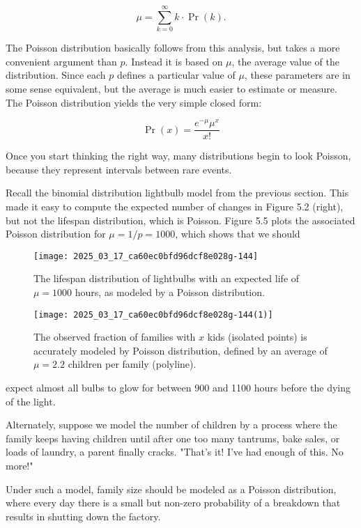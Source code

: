 \documentclass[10pt]{article}
\begin{document}
\[
\mu=\sum_{k=0}^{\infty} k \cdot \operatorname{Pr}(k).
\]

The Poisson distribution basically follows from this analysis, but takes a more convenient argument than $p$. Instead it is based on $\mu$, the average value of the distribution. Since each $p$ defines a particular value of $\mu$, these parameters are in some sense equivalent, but the average is much easier to estimate or measure. The Poisson distribution yields the very simple closed form:

\[
\operatorname{Pr}(x)=\frac{e^{-\mu} \mu^{x}}{x!}
\]

Once you start thinking the right way, many distributions begin to look Poisson, because they represent intervals between rare events.

Recall the binomial distribution lightbulb model from the previous section. This made it easy to compute the expected number of changes in Figure 5.2 (right), but not the lifespan distribution, which is Poisson. Figure 5.5 plots the associated Poisson distribution for $\mu=1 / p=1000$, which shows that we should\\
\begin{figure}[h]
\centering
\texttt{[image: 2025\_03\_17\_ca60ec0bfd96dcf8e028g-144]}
\caption{The lifespan distribution of lightbulbs with an expected life of $\mu= 1000$ hours, as modeled by a Poisson distribution.}
\end{figure}

\begin{figure}[h]
\centering
\texttt{[image: 2025\_03\_17\_ca60ec0bfd96dcf8e028g-144(1)]}
\caption{The observed fraction of families with $x$ kids (isolated points) is accurately modeled by Poisson distribution, defined by an average of $\mu=2.2$ children per family (polyline).}
\end{figure}

expect almost all bulbs to glow for between 900 and 1100 hours before the dying of the light.

Alternately, suppose we model the number of children by a process where the family keeps having children until after one too many tantrums, bake sales, or loads of laundry, a parent finally cracks. "That's it! I've had enough of this. No more!"

Under such a model, family size should be modeled as a Poisson distribution, where every day there is a small but non-zero probability of a breakdown that results in shutting down the factory.
\end{document}
